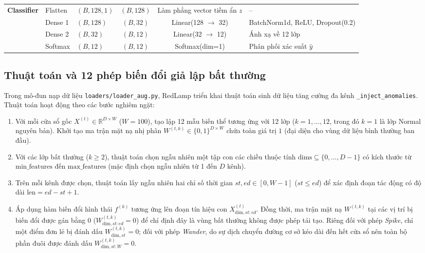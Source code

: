 \documentclass[sigconf,nonacm]{acmart}
\begin{document}
\begin{table}[t]
\begin{tabularx}{\textwidth}{lllccl}
\midrule
\multirow{4}{*}{\textbf{Classifier}} 
& Flatten & $(B, 128, 1)$ & $(B, 128)$ & Làm phẳng vector tiềm ẩn $z$ & -- \\
& Dense 1 & $(B, 128)$ & $(B, 32)$ & Linear(128 $\rightarrow$ 32) & BatchNorm1d, ReLU, Dropout(0.2) \\
& Dense 2 & $(B, 32)$ & $(B, 12)$ & Linear(32 $\rightarrow$ 12) & Ánh xạ về 12 lớp \\
& Softmax & $(B, 12)$ & $(B, 12)$ & Softmax(dim=1) & Phân phối xác suất $\hat{y}$ \\
\bottomrule
\end{tabularx}
\end{table}

\subsection{Thuật toán và 12 phép biến đổi giả lập bất thường}

Trong mô-đun nạp dữ liệu \texttt{loaders/loader\_aug.py}, RedLamp triển khai thuật toán sinh dữ liệu tăng cường đa kênh \texttt{\_inject\_anomalies}. Thuật toán hoạt động theo các bước nghiêm ngặt:
\begin{enumerate}[leftmargin=*, itemsep=2pt, parsep=0pt]
    \item Với mỗi cửa sổ gốc $X^{(t)} \in \mathbb{R}^{D \times W}$ ($W=100$), tạo lập 12 mẫu biến thể tương ứng với 12 lớp ($k=1, \dots, 12$, trong đó $k=1$ là lớp Normal nguyên bản). Khởi tạo ma trận mặt nạ nhị phân $W^{(t,k)} \in \{0, 1\}^{D \times W}$ chứa toàn giá trị $1$ (đại diện cho vùng dữ liệu bình thường ban đầu).
    \item Với các lớp bất thường ($k \ge 2$), thuật toán chọn ngẫu nhiên một tập con các chiều thuộc tính $\text{dims} \subseteq \{0, \dots, D-1\}$ có kích thước từ $\text{min\_features}$ đến $\text{max\_features}$ (mặc định chọn ngẫu nhiên từ 1 đến $D$ kênh).
    \item Trên mỗi kênh được chọn, thuật toán lấy ngẫu nhiên hai chỉ số thời gian $st, ed \in [0, W-1]$ ($st \le ed$) để xác định đoạn tác động có độ dài $\text{len} = ed - st + 1$.
    \item Áp dụng hàm biến đổi hình thái $f^{(k)}$ tương ứng lên đoạn tín hiệu con $X_{\text{dim}, st:ed}^{(t)}$. Đồng thời, ma trận mặt nạ $W^{(t,k)}$ tại các vị trí bị biến đổi được gán bằng $0$ ($W_{\text{dim}, st:ed}^{(t,k)} = 0$) để chỉ định đây là vùng bất thường không được phép tái tạo. Riêng đối với phép \textit{Spike}, chỉ một điểm đơn lẻ bị đánh dấu $W_{\text{dim}, st}^{(t,k)} = 0$; đối với phép \textit{Wander}, do sự dịch chuyển đường cơ sở kéo dài đến hết cửa sổ nên toàn bộ phần đuôi được đánh dấu $W_{\text{dim}, st:W}^{(t,k)} = 0$.
\end{enumerate}
\end{document}
